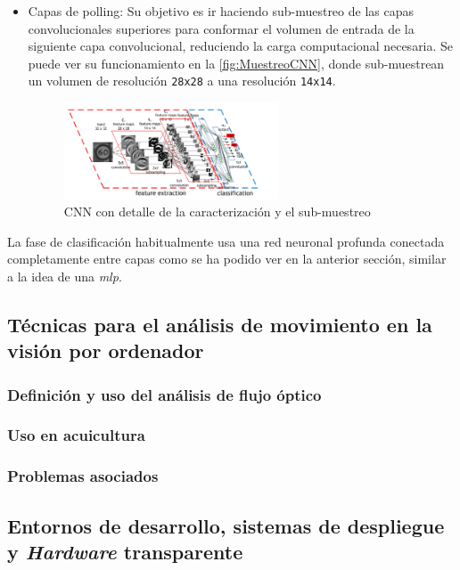 \begin{itemize}
    \item Capas de polling: Su objetivo es ir haciendo sub-muestreo de las capas convolucionales superiores para conformar el volumen de entrada de la siguiente capa convolucional, reduciendo la carga computacional necesaria. 
    Se puede ver su funcionamiento en la \autoref{fig:MuestreoCNN}, donde sub-muestrean un volumen de resolución \texttt{28x28} a una resolución \texttt{14x14}.
    \begin{figure}[H]
        \centering
        \includegraphics[width=0.6\textwidth]{images/4/EjemploPolling.png}
        \caption{CNN con detalle de la caracterización y el sub-muestreo\cite{ConvolutionalNeuralNetwork}}
        \label{fig:MuestreoCNN}
    \end{figure}

\end{itemize}

La fase de clasificación habitualmente usa una red neuronal profunda conectada completamente entre capas como se ha podido ver en la anterior sección, similar a la idea de una \textit{\acrshort{mlp}}.






\subsection{Técnicas para el análisis  de movimiento en la visión por ordenador}

\subsubsection{Definición y uso del análisis de flujo óptico}

\subsubsection{Uso en acuicultura}

\subsubsection{Problemas asociados}

\subsection{Entornos de desarrollo, sistemas de despliegue y \textit{Hardware} transparente}